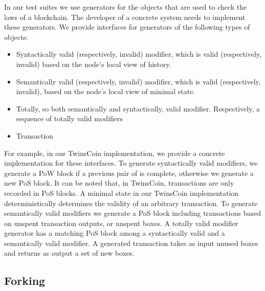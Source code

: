 In our test suites we use generators for the objects that are used to check the laws of a blockchain. The developer of a concrete system needs to implement these generators. We provide interfaces for generators of the following types of objects:

\begin{itemize}
	\item{Syntactically valid (respectively, invalid) modifier, which is valid (respectively, invalid) based on the node's local view of history.}
	\item{Semantically valid (respectively, invalid) modifier, which is valid (respectively, invalid), based on the node's local view of minimal state.}
	\item{Totally, so both semantically and syntactically, valid modifier. Respectively, a sequence of totally valid modifiers}
	\item{Transaction}
\end{itemize}

For example, in our TwinsCoin implementation, we provide a concrete implementation for these interfaces. To generate syntactically valid modifiers, we generate a PoW block if a previous pair of {\em<PoW block, PoS block>} is complete, otherwise we generate a new PoS block. It can be noted that, in TwinsCoin, transactions are only recorded in PoS blocks. A minimal state in our TwinsCoin implementation deterministically determines the validity of an arbitrary transaction. To generate semantically valid modifiers we generate a PoS block including transactions based on unspent transaction outputs, or unspent boxes. A totally valid modifier generator has a matching PoS block among a syntactically valid and a semantically valid modifier. A generated transaction takes as input unused boxes and returns as output a set of new boxes.

\subsection{Forking}



